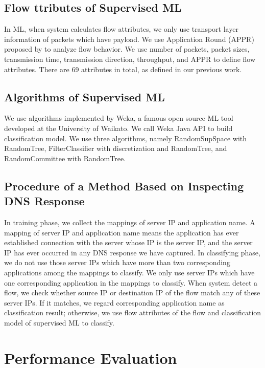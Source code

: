 \documentclass[journal]{IEEEtran}
\begin{document}
\subsection{Flow ttributes of Supervised ML}
In ML, when system calculates flow attributes, we only use transport layer information of packets which have payload.
We use Application Round (APPR) proposed by\cite{classfication-cloud} to analyze flow behavior.
We use number of packets, packet sizes, transmission time,
transmission direction, throughput, and APPR to define flow attributes.
There are 69 attributes in total, as defined in our previous work\cite{Chia-Chin-master}.



\subsection{Algorithms of Supervised ML}
We use algorithms implemented by Weka, a famous open source ML tool developed at the University of Waikato.
We call Weka Java API to build classification model.
We use three algorithms, namely RandomSupSpace with RandomTree\cite{TinKamHo1998},
FilterClassifier with discretization and RandomTree, and RandomCommittee with RandomTree.



\subsection{Procedure of a Method Based on Inspecting DNS Response}
In training phase, we collect the mappings of server IP and application name.
A mapping of server IP and application name means the application has ever established connection
with the server whose IP is the server IP, and the server IP has ever occurred in any DNS response we have captured.
In classifying phase, we do not use those server IPs which have more than two corresponding applications among the mappings to classify.
We only use server IPs which have one corresponding application in the mappings to classify.
When system detect a flow, we check whether source IP or destination IP of the flow match any of these server IPs.
If it matches, we regard corresponding application name as classification result;
otherwise, we use flow attributes of the flow and classification model of supervised ML to classify.





\section{Performance Evaluation}
\end{document}
